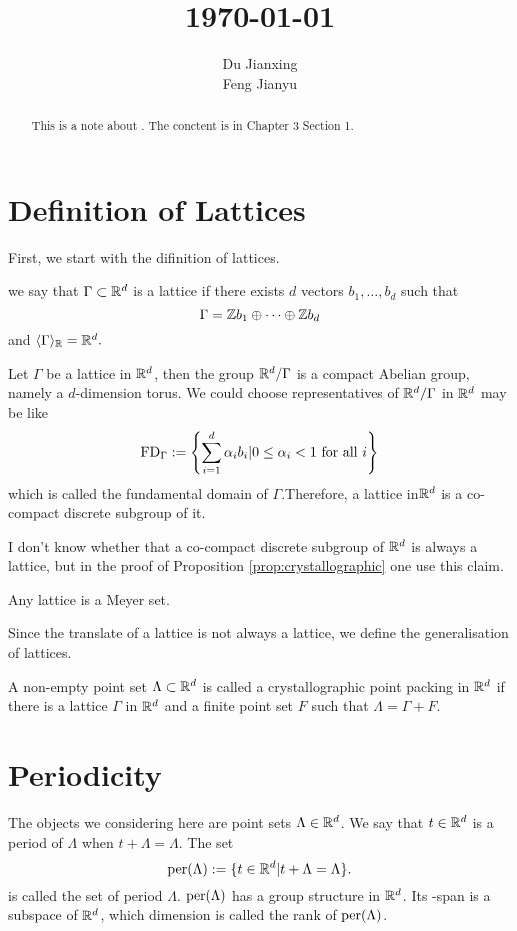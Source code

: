 \documentclass{article}
\title{\today}
\date{}
\author{
 Du Jianxing  \\
   \And
Feng Jianyu  
}
\begin{document}
\maketitle

\begin{abstract}
This is a note about \cite{baake2013aperiodic}. The conctent is in Chapter 3 Section 1.
\end{abstract}



\section{Definition of Lattices}
First, we start with the difinition of lattices.
\begin{definition}
	we say that $\Gamma\subset\mathbb{R}^d$ is a lattice if there exists $d$ vectors $b_1,\dots,b_d$ such that
	\[\Gamma=\mathbb{Z} b_1\oplus\cdots\oplus\mathbb{Z} b_d\]
	and  $\langle\Gamma\rangle_{\mathbb{R}}=\mathbb{R}^d.$
\end{definition}
Let $\Gamma$ be a lattice in $\mathbb{R}^d$, then the group $\mathbb{R}^d/\Gamma$ is a compact Abelian group, namely a $d$-dimension torus. We could choose representatives of $\mathbb{R}^d/\Gamma$ in $\mathbb{R}^d$ may be like
$$ 
\operatorname{FD}_{\Gamma}:=\left\{\sum_{i=1}^{d} \alpha_{i} b_{i} | 0 \leq \alpha_{i}<1 \text { for all } i\right\}
$$
which is called the fundamental domain of $\Gamma$.Therefore, a lattice in$\mathbb{R}^d$ is a co-compact discrete subgroup of it.
\begin{remark}
	I don't know whether that a co-compact discrete subgroup of $\mathbb{R}^d$ is always a lattice, but in the proof of Proposition \ref{prop:crystallographic} one use this claim.
	
\end{remark}	
	
\begin{lemma} 
	Any lattice is a Meyer set.
\end{lemma}
Since the translate of a lattice is not always a lattice, we define the generalisation of lattices.
\begin{definition}
	A non-empty point set $\Lambda\subset \mathbb{R}^d$ is called a crystallographic
	point packing in $\mathbb{R}^d$ if there is a lattice $\Gamma$ in $\mathbb{R}^d$ and a finite point set $F$ such
	that $\Lambda=\Gamma+F$.
\end{definition}

\section{Periodicity}
The objects we considering here are point sets $\Lambda\in\mathbb{R}^d$. We say that $t\in\mathbb{R}^d$ is a period of $\Lambda$ when $t+\Lambda=\Lambda.$ The set
\[\operatorname{per}(\Lambda):=\{t\in\mathbb{R}^d|t+\Lambda=\Lambda\}.\]
is called the set of period $\Lambda$. $\operatorname{per}(\Lambda)$ has a group structure in $\mathbb{R}^d$. Its \R-span is a subspace of $\mathbb{R}^d$, which dimension is called the rank of $\operatorname{per}(\Lambda)$.
\end{document}
